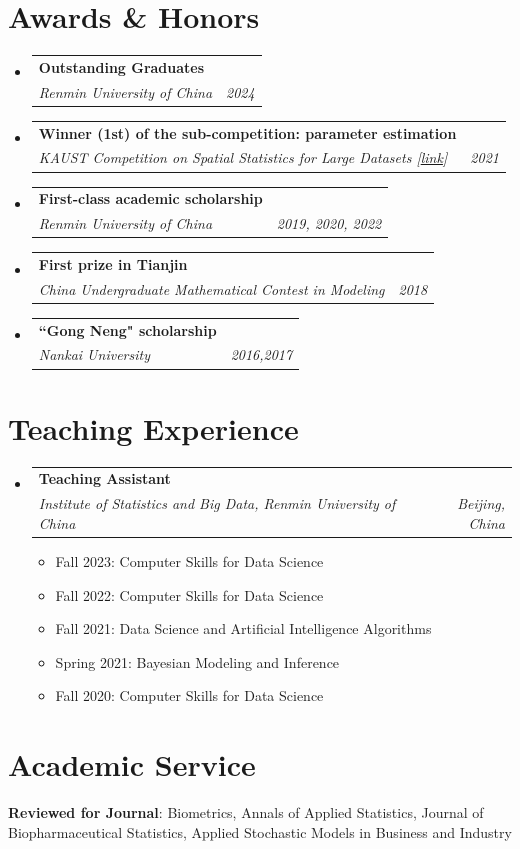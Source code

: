 \documentclass[letterpaper,11pt]{article}
\makeatletter
\newcommand{\resumeItem}[1]{
  \item{
    {#1 \vspace{-4pt}}
  }
}
\newcommand{\resumeSubheading}[4]{
  \vspace{-2pt}\item
    \begin{tabular*}{0.97\textwidth}[t]{l@{\extracolsep{\fill}}r}
      \textbf{#1} & #2 \\
      \textit{\small #3} & \textit{\small #4} \\
    \end{tabular*}\vspace{-10pt}
}
\newcommand{\resumeSubHeadingListStart}{\begin{itemize}[leftmargin=0.15in, label={}]}
\newcommand{\resumeSubHeadingListEnd}{\end{itemize}}
\newcommand{\resumeItemListStart}{\begin{itemize}}
\newcommand{\resumeItemListEnd}{\end{itemize}\vspace{-2pt}}
\makeatother
\begin{document}
\section{Awards \& Honors} 
\resumeSubHeadingListStart
    \resumeSubheading
    {Outstanding Graduates}{}
    {Renmin University of China}{2024}
    \resumeSubheading
    {Winner (1st) of the sub-competition: parameter estimation}{}
    {KAUST Competition on Spatial Statistics for Large Datasets [\href{https://cemse.kaust.edu.sa/stsds/2021-kaust-competition-spatial-statistics-large-datasets}{link}]}{2021}
    \resumeSubheading
    {First-class academic scholarship}{}
    {Renmin University of China}{2019, 2020, 2022}
    \resumeSubheading
    {First prize in Tianjin}{}
    {China Undergraduate Mathematical Contest in Modeling}{2018}
    \resumeSubheading
    {``Gong Neng" scholarship}{}
    {Nankai University}{2016,2017}
    
\resumeSubHeadingListEnd

\section{Teaching Experience} 
\resumeSubHeadingListStart
    \resumeSubheading
    {Teaching Assistant}{}
     {Institute of Statistics and Big Data, Renmin University of China}{Beijing, China}
      \resumeItemListStart
        \small
        \resumeItem{Fall 2023: Computer Skills for Data Science}
        \resumeItem{Fall 2022: Computer Skills for Data Science}
        \resumeItem{Fall 2021: Data Science and Artificial Intelligence Algorithms}
        \resumeItem{Spring 2021: Bayesian Modeling and Inference}
        \resumeItem{Fall 2020: Computer Skills for Data Science}
        \resumeItemListEnd
\resumeSubHeadingListEnd

\section{Academic Service}
\begin{itemize}[leftmargin=0.15in, label={}]
    \normalsize{\item{
     \textbf{Reviewed for Journal}{: Biometrics, Annals of Applied Statistics,  Journal of Biopharmaceutical Statistics, Applied Stochastic Models in Business and Industry} 
    }}
 \end{itemize}
\end{document}

